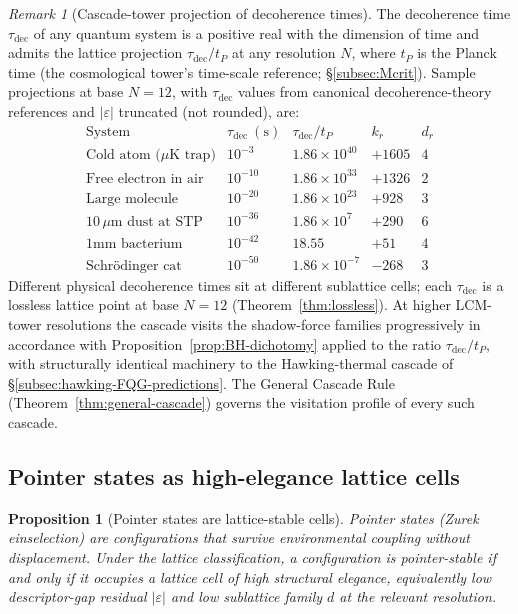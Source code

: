 \documentclass[11pt,a4paper]{article}
\newtheorem{proposition}[theorem]{Proposition}
\theoremstyle{definition}
\theoremstyle{remark}
\newtheorem{remark}[theorem]{Remark}
\begin{document}
\begin{remark}[Cascade-tower projection of decoherence times]\label{rem:tau-dec-cascade}
The decoherence time $\tau_{\mathrm{dec}}$ of any quantum system is a positive real with the dimension of time and admits the lattice projection $\tau_{\mathrm{dec}}/t_{P}$ at any resolution $N$, where $t_{P}$ is the Planck time (the cosmological tower's time-scale reference; \S\ref{subsec:Mcrit}). Sample projections at base $N = 12$, with $\tau_{\mathrm{dec}}$ values from canonical decoherence-theory references and $|\varepsilon|$ truncated (not rounded), are:
\[
\begin{array}{l|c|c|c|c}
\text{System} & \tau_{\mathrm{dec}}~(\text{s}) & \tau_{\mathrm{dec}}/t_{P} & k_{r} & d_{r} \\ \hline
\text{Cold atom (}\mu\text{K trap)} & 10^{-3} & 1.86\times 10^{40} & +1605 & 4 \\
\text{Free electron in air} & 10^{-10} & 1.86\times 10^{33} & +1326 & 2 \\
\text{Large molecule} & 10^{-20} & 1.86\times 10^{23} & +928 & 3 \\
10\,\mu\text{m dust at STP} & 10^{-36} & 1.86\times 10^{7} & +290 & 6 \\
\text{1mm bacterium} & 10^{-42} & 18.55 & +51 & 4 \\
\text{Schr\"odinger cat} & 10^{-50} & 1.86\times 10^{-7} & -268 & 3
\end{array}
\]
Different physical decoherence times sit at different sublattice cells; each $\tau_{\mathrm{dec}}$ is a lossless lattice point at base $N=12$ (Theorem~\ref{thm:lossless}). At higher LCM-tower resolutions the cascade visits the shadow-force families progressively in accordance with Proposition~\ref{prop:BH-dichotomy} applied to the ratio $\tau_{\mathrm{dec}}/t_{P}$, with structurally identical machinery to the Hawking-thermal cascade of \S\ref{subsec:hawking-FQG-predictions}. The General Cascade Rule (Theorem~\ref{thm:general-cascade}) governs the visitation profile of every such cascade.
\end{remark}

\subsection{Pointer states as high-elegance lattice cells}\label{subsec:pointer-states}

\begin{proposition}[Pointer states are lattice-stable cells]\label{prop:pointer-stable}
Pointer states (Zurek einselection) are configurations that survive environmental coupling without displacement. Under the lattice classification, a configuration is pointer-stable if and only if it occupies a lattice cell of high structural elegance, equivalently low descriptor-gap residual $|\varepsilon|$ and low sublattice family $d$ at the relevant resolution.
\end{proposition}
\end{document}
